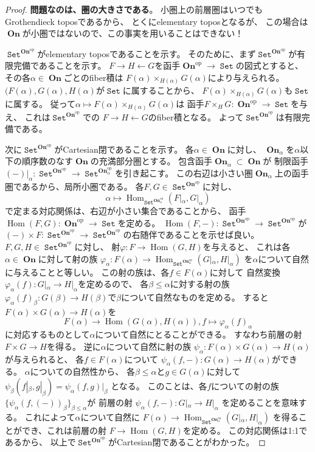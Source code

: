 \documentclass[uplatex]{jsarticle}
\theoremstyle{definition}
\newcommand{\op}{\mathrm{op}}
\DeclareMathOperator{\Hom}{Hom}
\DeclareMathOperator{\sfSet}{\mathtt{Set}}
\DeclareMathOperator{\On}{\mathbf{On}}
\begin{document}
\begin{proof}
  \textbf{問題なのは、圏の大きさである}。
  小圏上の前層圏はいつでもGrothendieck toposであるから、
  とくにelementary toposとなるが、
  この場合は\(\On\)が小圏ではないので、この事実を用いることはできない！

  \(\sfSet^{\On^{\op}}\)がelementary toposであることを示す。
  そのために、まず\(\sfSet^{\On^{\op}}\)が有限完備であることを示す。
  \(F\to H \gets G\)を函手\(\On^{\op}\to \sfSet\)の図式とすると、
  その各\(\alpha\in \On\)ごとのfiber積は
  \(F(\alpha)\times_{H(\alpha)}G(\alpha)\)により与えられる。
  \((F(\alpha),G(\alpha),H(\alpha)\)が\(\sfSet\)に属することから、
  \(F(\alpha)\times_{H(\alpha)}G(\alpha)\)も\(\sfSet\)に属する。
  従って\(\alpha\mapsto F(\alpha)\times_{H(\alpha)}G(\alpha)\)は
  函手\(F\times_HG: \On^{\op}\to \sfSet\)を与え、
  これは\(\sfSet^{\On^{\op}}\)での
  \(F\to H \gets G\)のfiber積となる。
  よって\(\sfSet^{\On^{\op}}\)は有限完備である。

  次に\(\sfSet^{\On^{\op}}\)がCartesian閉であることを示す。
  各\(\alpha\in \On\)に対し、
  \(\On_{\alpha}\)を\(\alpha\)以下の順序数のなす\(\On\)の充満部分圏とする。
  包含函手\(\On_{\alpha}\subset \On\)が
  制限函手\((-)|_{\alpha} : \sfSet^{\On^{\op}} \to \sfSet^{\On_{\alpha}^{\op}}\)を引き起こす。
  この右辺は小さい圏\(\On_{\alpha}\)上の函手圏であるから、局所小圏である。
  各\(F,G\in\sfSet^{\On^{\op}}\)に対し、
  \[
  \alpha \mapsto \Hom_{\sfSet^{\On_{\alpha}^{\op}}}(F|_\alpha,G|_\alpha)
  \]
  で定まる対応関係は、右辺が小さい集合であることから、
  函手\(\Hom(F,G): \On^{\op}\to \sfSet\)を定める。
  \(\Hom(F,-):\sfSet^{\On^{\op}}\to \sfSet^{\On^{\op}}\)が
  \((-)\times F:\sfSet^{\On^{\op}}\to \sfSet^{\On^{\op}}\)の右随伴であることを示せば良い。
  \(F,G,H\in \sfSet^{\On^{\op}}\)に対し、
  射\(\varphi:F\to \Hom(G,H)\)を与えると、
  これは各\(\alpha\in\On\)に対して射の族
  \(\varphi_\alpha:F(\alpha) \to \Hom_{\sfSet^{\On_\alpha^{\op}}}(G|_\alpha,H|_\alpha)\)
  を\(\alpha\)について自然に与えることと等しい。
  この射の族は、各\(f\in F(\alpha)\)に対して
  自然変換\(\varphi_\alpha(f) : G|_\alpha\to H|_\alpha\)を定めるので、
  各\(\beta \leq \alpha\)に対する射の族
  \(\varphi_\alpha(f)_\beta:G(\beta)\to H(\beta)\)で\(\beta\)について自然なものを定める。
  すると
  \(F(\alpha)\times G(\alpha) \to H(\alpha)\)を
  \[F(\alpha) \to \Hom(G(\alpha),H(\alpha)) , f\mapsto \varphi_\alpha(f)_\alpha\]
  に対応するものとして\(\alpha\)について自然にとることができる。
  すなわち前層の射\(F\times G\to H\)を得る。
  逆に\(\alpha\)について自然に射の族
  \(\psi_\alpha:F(\alpha)\times G(\alpha) \to H(\alpha)\)
  が与えられると、
  各\(f\in F(\alpha)\)について
  \(\psi_\alpha(f,-):G(\alpha)\to H(\alpha)\)ができる。
  \(\alpha\)についての自然性から、
  各\(\beta \leq \alpha\)と\(g\in G(\alpha)\)に対して
  \(\psi_\beta(f|_\beta,g|_\beta) = \psi_\alpha(f,g)|_\beta\)
  となる。
  このことは、各\(f\)についての射の族
  \(\{\psi_\alpha(f,(-))_\beta\}_{\beta \leq \alpha}\)が
  前層の射
  \(\psi_\alpha(f,-): G|_\alpha \to H|_\alpha\)
  を定めることを意味する。
  これによって\(\alpha\)について自然に
  \(F(\alpha) \to \Hom_{\sfSet^{\On_\alpha^{\op}}}(G|_\alpha,H|_\alpha)\)
  を得ることができ、これは前層の射
  \(F\to \Hom(G,H)\)を定める。
  この対応関係は1:1であるから、
  以上で\(\sfSet^{\On^{\op}}\)がCartesian閉であることがわかった。


\end{proof}
\end{document}
